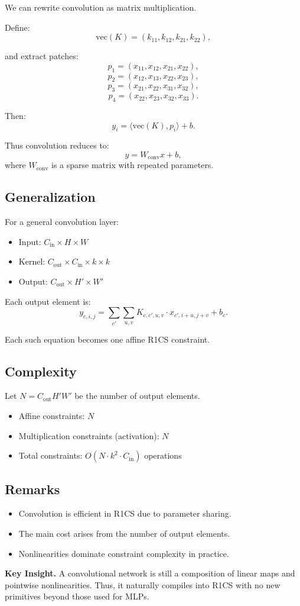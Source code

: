 We can rewrite convolution as matrix multiplication.

Define:
\[
\text{vec}(K) = (k_{11}, k_{12}, k_{21}, k_{22}),
\]

and extract patches:
\[
p_1 = (x_{11},x_{12},x_{21},x_{22}),
\]
\[
p_2 = (x_{12},x_{13},x_{22},x_{23}),
\]
\[
p_3 = (x_{21},x_{22},x_{31},x_{32}),
\]
\[
p_4 = (x_{22},x_{23},x_{32},x_{33}).
\]

Then:
\[
y_i = \langle \text{vec}(K), p_i \rangle + b.
\]

Thus convolution reduces to:
\[
y = W_{\text{conv}} x + b,
\]
where $W_{\text{conv}}$ is a sparse matrix with repeated parameters.

\subsection{Generalization}

For a general convolution layer:

\begin{itemize}
\item Input: $C_{\text{in}} \times H \times W$
\item Kernel: $C_{\text{out}} \times C_{\text{in}} \times k \times k$
\item Output: $C_{\text{out}} \times H' \times W'$
\end{itemize}

Each output element is:
\[
y_{c,i,j} = \sum_{c'} \sum_{u,v}
K_{c,c',u,v} \cdot x_{c',i+u,j+v} + b_c.
\]

Each such equation becomes one affine R1CS constraint.

\subsection{Complexity}

Let $N = C_{\text{out}} H' W'$ be the number of output elements.

\begin{itemize}
\item Affine constraints: $N$
\item Multiplication constraints (activation): $N$
\item Total constraints: $O(N \cdot k^2 \cdot C_{\text{in}})$ operations
\end{itemize}

\subsection{Remarks}

\begin{itemize}
\item Convolution is efficient in R1CS due to parameter sharing.
\item The main cost arises from the number of output elements.
\item Nonlinearities dominate constraint complexity in practice.
\end{itemize}

\medskip

\noindent
\textbf{Key Insight.}  
A convolutional network is still a composition of linear maps and pointwise nonlinearities.  
Thus, it naturally compiles into R1CS with no new primitives beyond those used for MLPs.